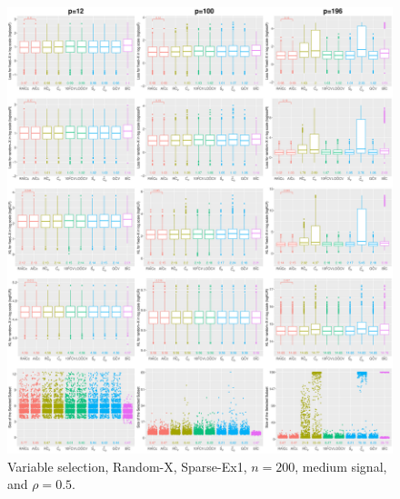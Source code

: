 \begin{figure}[!ht]
\centering
\includegraphics[width=\textwidth]{figures/supplement/randomx/subset_selection/Sparse-Ex1_n200_msnr_rho05.eps}
\caption{Variable selection, Random-X, Sparse-Ex1, $n=200$, medium signal, and $\rho=0.5$.}
\end{figure}
\clearpage
